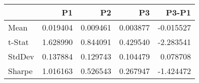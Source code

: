 \begin{tabular}{lrrrr}
\toprule
 & P1 & P2 & P3 & P3-P1 \\
\midrule
Mean & 0.019404 & 0.009461 & 0.003877 & -0.015527 \\
t-Stat & 1.628990 & 0.844091 & 0.429540 & -2.283541 \\
StdDev & 0.137884 & 0.129743 & 0.104479 & 0.078708 \\
Sharpe & 1.016163 & 0.526543 & 0.267947 & -1.424472 \\
\bottomrule
\end{tabular}

